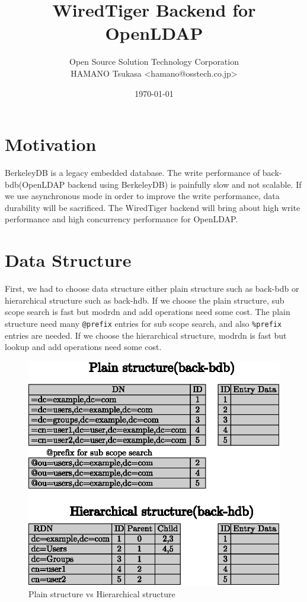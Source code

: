\documentclass[a4paper
,twocolumn
]{article}
\title{WiredTiger Backend for OpenLDAP}
\author{Open Source Solution Technology Corporation \\ HAMANO Tsukasa \textless{}hamano@osstech.co.jp\textgreater{}}
\date{\today}
\begin{document}
\maketitle
{}
\section{Motivation}\label{motivation}

BerkeleyDB is a legacy embedded database. The write performance of
back-bdb(OpenLDAP backend using BerkeleyDB) is painfully slow and not
scalable. If we use asynchronous mode in order to improve the write
performance, data durability will be sacrificed. The WiredTiger backend
will bring about high write performance and high concurrency performance
for OpenLDAP.

\section{Data Structure}\label{data-structure}

First, we had to choose data structure either plain structure such as
back-bdb or hierarchical structure such as back-hdb. If we choose the
plain structure, sub scope search is fast but modrdn and add operations
need some cost. The plain structure need many \texttt{@prefix} entries
for sub scope search, and also \texttt{\%prefix} entries are needed. If
we choose the hierarchical structure, modrdn is fast but lookup and add
operations need some cost.

\begin{figure}[H]
\centering
\includegraphics[width=0.9\columnwidth]{figure/plain_vs_hierarchical.eps}
\caption{Plain structure vs Hierarchical structure}
\end{figure}
\end{document}
